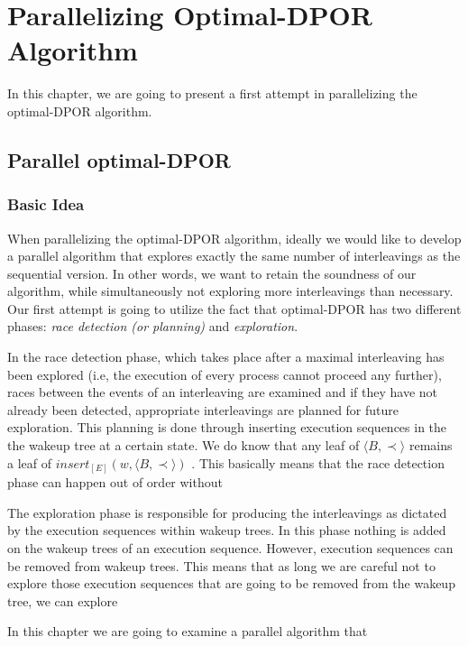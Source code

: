 \chapter{Parallelizing Optimal-DPOR Algorithm}
\label{paradpor_opt}

In this chapter, we are going to present a first attempt in parallelizing the optimal-DPOR
algorithm.

\section{Parallel optimal-DPOR}

\subsection{Basic Idea}

When parallelizing the optimal-DPOR algorithm, ideally we would like to develop a parallel algorithm that explores
exactly the same number of interleavings as the sequential version. In other words, we want to retain
the soundness of our algorithm, while simultaneously not exploring more interleavings than necessary. Our first
attempt is going to utilize the fact that
optimal-DPOR has two different phases: \textit{race detection (or planning)} and \textit{exploration}.

In the race detection phase, which takes place after a maximal interleaving has been explored
(i.e, the execution of every process cannot proceed any further),
races between the events of an interleaving are examined and if
they have not already been detected, appropriate interleavings are planned for future exploration.
This planning is done through inserting execution sequences in the the wakeup tree at a certain state.
We do know that any leaf of $\langle B , \prec \rangle$ remains a leaf of $insert_{[E]}(w,\langle B , \prec \rangle)$
\cite{AbdullaAronisJohnssonSagonasDPOR2014}. This basically means that the race detection phase can happen out of order
without 

The exploration phase is responsible for producing the interleavings as dictated by the execution sequences within wakeup trees. In this phase
nothing is added on the wakeup trees of an execution sequence. However, execution sequences can be removed from wakeup trees. This means
that as long we are careful not to explore those execution sequences that are going to be removed from the wakeup tree, we
can explore 

In this chapter we are going to examine a parallel algorithm that 

